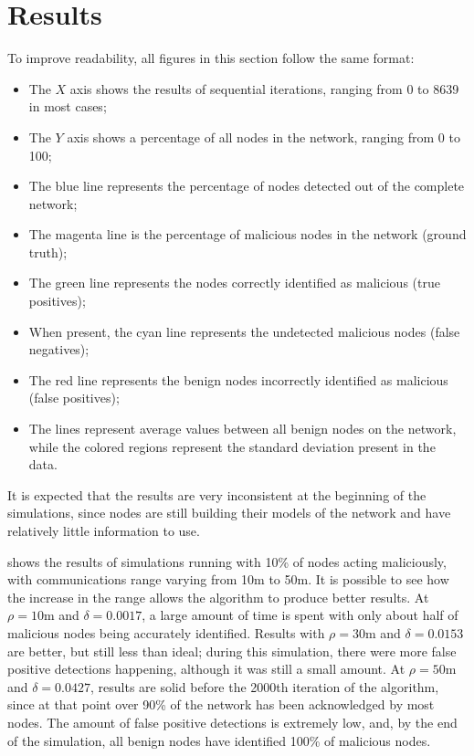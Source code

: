 \section{Results}
\label{section:results}

To improve readability, all figures in this section follow the same format:
\begin{itemize}
	\item The $X$ axis shows the results of sequential iterations, ranging from 0 to 8639 in most cases;
	\item The $Y$ axis shows a percentage of all nodes in the network, ranging from 0 to 100;
	\item The blue line represents the percentage of nodes detected out of the complete network;
	\item The magenta line is the percentage of malicious nodes in the network (ground truth);
	\item The green line represents the nodes correctly identified as malicious (true positives);
	\item When present, the cyan line represents the undetected malicious nodes (false negatives); 
	\item The red line represents the benign nodes incorrectly identified as malicious (false positives);
	\item The lines represent average values between all benign nodes on the network, while the colored regions represent the standard deviation present in the data.
\end{itemize}


It is expected that the results are very inconsistent at the beginning of the simulations, since nodes are still building their models of the network and have relatively little information to use.

 shows the results of simulations running with 10\% of nodes acting maliciously, with communications range varying from 10m to 50m.
It is possible to see how the increase in the range allows the algorithm to produce better results.
At $\rho = 10$m and $\delta = 0.0017$, a large amount of time is spent with only about half of malicious nodes being accurately identified.
Results with $\rho = 30$m and $\delta = 0.0153$ are better, but still less than ideal; during this simulation, there were more false positive detections happening, although it was still a small amount.
At $\rho = 50$m and $\delta = 0.0427$, results are solid before the 2000th iteration of the algorithm, since at that point over 90\% of the network has been acknowledged by most nodes.
The amount of false positive detections is extremely low, and, by the end of the simulation, all benign nodes have identified 100\% of malicious nodes.

